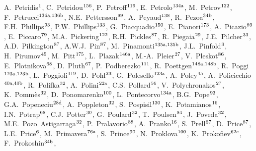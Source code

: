 \begin{flushleft}
A.~Petridis$^\textrm{\scriptsize 1}$,
C.~Petridou$^\textrm{\scriptsize 156}$,
P.~Petroff$^\textrm{\scriptsize 119}$,
E.~Petrolo$^\textrm{\scriptsize 134a}$,
M.~Petrov$^\textrm{\scriptsize 122}$,
F.~Petrucci$^\textrm{\scriptsize 136a,136b}$,
N.E.~Pettersson$^\textrm{\scriptsize 89}$,
A.~Peyaud$^\textrm{\scriptsize 138}$,
R.~Pezoa$^\textrm{\scriptsize 34b}$,
F.H.~Phillips$^\textrm{\scriptsize 93}$,
P.W.~Phillips$^\textrm{\scriptsize 133}$,
G.~Piacquadio$^\textrm{\scriptsize 150}$,
E.~Pianori$^\textrm{\scriptsize 173}$,
A.~Picazio$^\textrm{\scriptsize 89}$,
E.~Piccaro$^\textrm{\scriptsize 79}$,
M.A.~Pickering$^\textrm{\scriptsize 122}$,
R.H.~Pickles$^\textrm{\scriptsize 87}$,
R.~Piegaia$^\textrm{\scriptsize 29}$,
J.E.~Pilcher$^\textrm{\scriptsize 33}$,
A.D.~Pilkington$^\textrm{\scriptsize 87}$,
A.W.J.~Pin$^\textrm{\scriptsize 87}$,
M.~Pinamonti$^\textrm{\scriptsize 135a,135b}$,
J.L.~Pinfold$^\textrm{\scriptsize 3}$,
H.~Pirumov$^\textrm{\scriptsize 45}$,
M.~Pitt$^\textrm{\scriptsize 175}$,
L.~Plazak$^\textrm{\scriptsize 146a}$,
M.-A.~Pleier$^\textrm{\scriptsize 27}$,
V.~Pleskot$^\textrm{\scriptsize 86}$,
E.~Plotnikova$^\textrm{\scriptsize 68}$,
D.~Pluth$^\textrm{\scriptsize 67}$,
P.~Podberezko$^\textrm{\scriptsize 111}$,
R.~Poettgen$^\textrm{\scriptsize 148a,148b}$,
R.~Poggi$^\textrm{\scriptsize 123a,123b}$,
L.~Poggioli$^\textrm{\scriptsize 119}$,
D.~Pohl$^\textrm{\scriptsize 23}$,
G.~Polesello$^\textrm{\scriptsize 123a}$,
A.~Poley$^\textrm{\scriptsize 45}$,
A.~Policicchio$^\textrm{\scriptsize 40a,40b}$,
R.~Polifka$^\textrm{\scriptsize 32}$,
A.~Polini$^\textrm{\scriptsize 22a}$,
C.S.~Pollard$^\textrm{\scriptsize 56}$,
V.~Polychronakos$^\textrm{\scriptsize 27}$,
K.~Pomm\`es$^\textrm{\scriptsize 32}$,
D.~Ponomarenko$^\textrm{\scriptsize 100}$,
L.~Pontecorvo$^\textrm{\scriptsize 134a}$,
B.G.~Pope$^\textrm{\scriptsize 93}$,
G.A.~Popeneciu$^\textrm{\scriptsize 28d}$,
A.~Poppleton$^\textrm{\scriptsize 32}$,
S.~Pospisil$^\textrm{\scriptsize 130}$,
K.~Potamianos$^\textrm{\scriptsize 16}$,
I.N.~Potrap$^\textrm{\scriptsize 68}$,
C.J.~Potter$^\textrm{\scriptsize 30}$,
G.~Poulard$^\textrm{\scriptsize 32}$,
T.~Poulsen$^\textrm{\scriptsize 84}$,
J.~Poveda$^\textrm{\scriptsize 32}$,
M.E.~Pozo~Astigarraga$^\textrm{\scriptsize 32}$,
P.~Pralavorio$^\textrm{\scriptsize 88}$,
A.~Pranko$^\textrm{\scriptsize 16}$,
S.~Prell$^\textrm{\scriptsize 67}$,
D.~Price$^\textrm{\scriptsize 87}$,
L.E.~Price$^\textrm{\scriptsize 6}$,
M.~Primavera$^\textrm{\scriptsize 76a}$,
S.~Prince$^\textrm{\scriptsize 90}$,
N.~Proklova$^\textrm{\scriptsize 100}$,
K.~Prokofiev$^\textrm{\scriptsize 62c}$,
F.~Prokoshin$^\textrm{\scriptsize 34b}$,

\end{flushleft}
